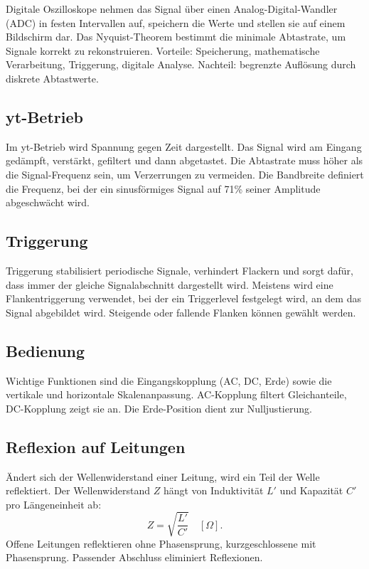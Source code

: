 Digitale Oszilloskope nehmen das Signal über einen Analog-Digital-Wandler (ADC) in festen Intervallen auf, speichern die Werte und stellen sie auf einem Bildschirm dar. Das Nyquist-Theorem bestimmt die minimale Abtastrate, um Signale korrekt zu rekonstruieren. Vorteile: Speicherung, mathematische Verarbeitung, Triggerung, digitale Analyse. Nachteil: begrenzte Auflösung durch diskrete Abtastwerte.

\subsection{yt-Betrieb}
Im yt-Betrieb wird Spannung gegen Zeit dargestellt. Das Signal wird am Eingang gedämpft, verstärkt, gefiltert und dann abgetastet. Die Abtastrate muss höher als die Signal-Frequenz sein, um Verzerrungen zu vermeiden. Die Bandbreite definiert die Frequenz, bei der ein sinusförmiges Signal auf 71\% seiner Amplitude abgeschwächt wird.

\subsection{Triggerung}
Triggerung stabilisiert periodische Signale, verhindert Flackern und sorgt dafür, dass immer der gleiche Signalabschnitt dargestellt wird. Meistens wird eine Flankentriggerung verwendet, bei der ein Triggerlevel festgelegt wird, an dem das Signal abgebildet wird. Steigende oder fallende Flanken können gewählt werden.

\subsection{Bedienung}
Wichtige Funktionen sind die Eingangskopplung (AC, DC, Erde) sowie die vertikale und horizontale Skalenanpassung. AC-Kopplung filtert Gleichanteile, DC-Kopplung zeigt sie an. Die Erde-Position dient zur Nulljustierung.

\subsection{Reflexion auf Leitungen}
Ändert sich der Wellenwiderstand einer Leitung, wird ein Teil der Welle reflektiert. Der Wellenwiderstand $Z$ hängt von Induktivität $L'$ und Kapazität $C'$ pro Längeneinheit ab:
\begin{equation}
Z = \sqrt{\frac{L'}{C'}} \quad [\Omega].
\end{equation}
Offene Leitungen reflektieren ohne Phasensprung, kurzgeschlossene mit Phasensprung. Passender Abschluss eliminiert Reflexionen.

